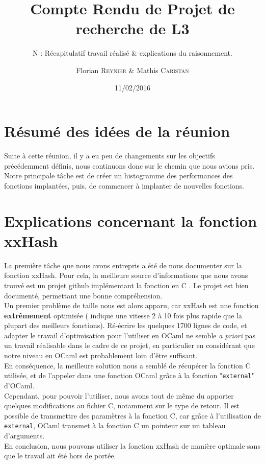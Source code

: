 \documentclass[final,twoside,article,10pt]{scrartcl}
\begin{document}
%
\title{Compte Rendu de Projet de recherche de L3}
\subtitle{N : Récapitulatif travail réalisé \& explications du raisonnement.}
\author{Florian \textsc{Reynier} \& Mathis \textsc{Caristan}}
%
\date{11/02/2016}

\maketitle

\section{Résumé des idées de la réunion}
    Suite à cette réunion, il y a eu peu de changements sur les objectifs précédemment définis, nous continuons donc sur le chemin que nous avions pris.
    Notre principale tâche est de créer un histogramme des performances des fonctions implantées, puis, de commencer à implanter de nouvelles fonctions.
\section{Explications concernant la fonction xxHash}
    La première tâche que nous avons entrepris a été de nous documenter sur la fonction xxHash. Pour cela, la meilleure source d'informations que nous avons trouvé est un projet github implémentant la fonction en C \cite{github}. Le projet est bien documenté, permettant une bonne compréhension.\\
    Un premier problème de taille nous est alors apparu, car xxHash est une fonction \textbf{extrêmement} optimisée (\cite{xxhash} indique une vitesse 2 à 10 fois plus rapide que la plupart des meilleurs fonctions).
    Ré-écrire les quelques 1700 lignes de code, et adapter le travail d'optimisation pour l'utiliser en OCaml ne semble \textit{a priori} pas un travail réalisable dans le cadre de ce projet, en particulier en considérant que notre niveau en OCaml est probablement loin d'être suffisant.\\
    En conséquence, la meilleure solution nous a semblé de récupérer la fonction C utilisée, et de l'appeler dans une fonction OCaml grâce à la fonction "\texttt{external}" d'OCaml.\\
    Cependant, pour pouvoir l'utiliser, nous avons tout de même du apporter quelques modifications au fichier C, notamment sur le type de retour. Il est possible de transmettre des paramètres à la fonction C, car grâce à l'utilisation de \texttt{external}, OCaml transmet à la fonction C un pointeur sur un tableau d'arguments.\\
    En conclusion, nous pouvons utiliser la fonction xxHash  de manière optimale sans que le travail ait été hors de portée.
\end{document}
